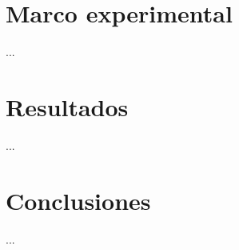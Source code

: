 \documentclass[12pt,letterpaper,oneside,openright]{book}
\begin{document}
\chapter{Marco experimental}

...

\chapter{Resultados}

...

\chapter{Conclusiones}

...


 
\end{document}
